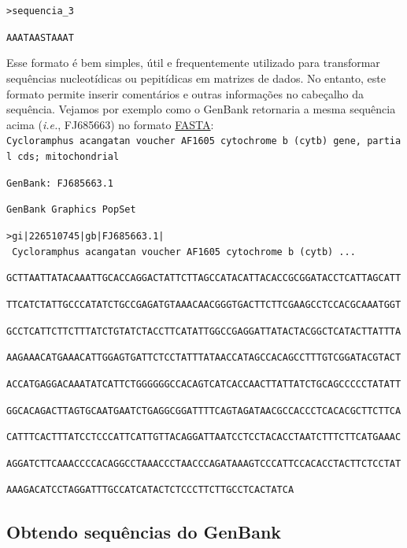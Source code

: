 \begin{refsection}
\noindent\texttt{>sequencia\_3}

\noindent\texttt{AAATAASTAAAT}

\normalsize

Esse formato é bem simples, útil e frequentemente utilizado para transformar sequências nucleotídicas ou pepitídicas em matrizes de dados. No entanto, este formato permite inserir comentários e outras informações no cabeçalho da sequência. Vejamos por exemplo como o GenBank retornaria a mesma sequência acima (\textit{i.e.}, FJ685663) no formato \href{http://pt.wikipedia.org/wiki/Formato\_FASTA}{FASTA}:\\

\scriptsize
\noindent\texttt{Cycloramphus~acangatan~voucher~AF1605~cytochrome~b~(cytb)~gene,~partial~cds;~mitochondrial}

\noindent\texttt{GenBank:~FJ685663.1}

\noindent\texttt{GenBank~Graphics~PopSet}

\noindent\texttt{>gi|226510745|gb|FJ685663.1|~Cycloramphus~acangatan~voucher~AF1605~cytochrome~b~(cytb) ...}

\noindent\texttt{GCTTAATTATACAAATTGCACCAGGACTATTCTTAGCCATACATTACACCGCGGATACCTCATTAGCATT}

\noindent\texttt{TTCATCTATTGCCCATATCTGCCGAGATGTAAACAACGGGTGACTTCTTCGAAGCCTCCACGCAAATGGT}

\noindent\texttt{GCCTCATTCTTCTTTATCTGTATCTACCTTCATATTGGCCGAGGATTATACTACGGCTCATACTTATTTA}

\noindent\texttt{AAGAAACATGAAACATTGGAGTGATTCTCCTATTTATAACCATAGCCACAGCCTTTGTCGGATACGTACT}

\noindent\texttt{ACCATGAGGACAAATATCATTCTGGGGGGCCACAGTCATCACCAACTTATTATCTGCAGCCCCCTATATT}

\noindent\texttt{GGCACAGACTTAGTGCAATGAATCTGAGGCGGATTTTCAGTAGATAACGCCACCCTCACACGCTTCTTCA}

\noindent\texttt{CATTTCACTTTATCCTCCCATTCATTGTTACAGGATTAATCCTCCTACACCTAATCTTTCTTCATGAAAC}

\noindent\texttt{AGGATCTTCAAACCCCACAGGCCTAAACCCTAACCCAGATAAAGTCCCATTCCACACCTACTTCTCCTAT}

\noindent\texttt{AAAGACATCCTAGGATTTGCCATCATACTCTCCCTTCTTGCCTCACTATCA}

\normalsize

\subsection{Obtendo sequências do GenBank}\label{tut7:genbank:retrieving}


\end{refsection}
